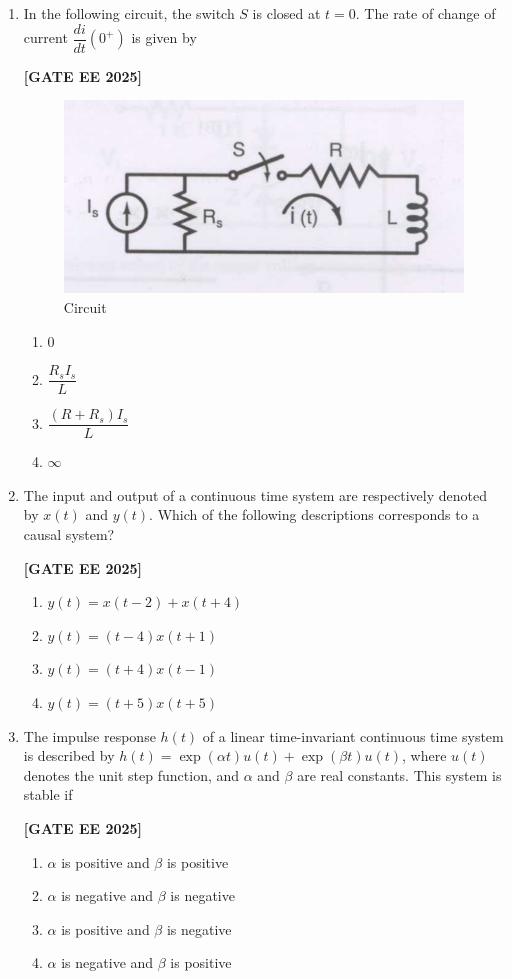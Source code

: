 \documentclass[12pt]{article}
\begin{document}
\begin{enumerate}[leftmargin=2.5em, label=\textbf{Q.\arabic*}., itemsep=2em]
\item In the following circuit, the switch $S$ is closed at $t = 0$. The rate of change of current $\dfrac{di}{dt}(0^+)$ is given by
 
\noindent \textbf{[GATE EE 2025]}
\begin{figure}[H]\centering
\includegraphics[width=0.5\columnwidth]{figs/q8.png}
\caption{Circuit}
\label{fig:q8}
\end{figure}
\begin{enumerate}
    \item 0
    \item $\dfrac{R_s I_s}{L}$
    \item $\dfrac{(R+R_s) I_s}{L}$
    \item $\infty$
\end{enumerate}

\item The input and output of a continuous time system are respectively denoted by $x(t)$ and $y(t)$. Which of the following descriptions corresponds to a causal system?
 
\noindent \textbf{[GATE EE 2025]}
\begin{enumerate}
    \item $y(t) = x(t-2) + x(t+4)$
    \item $y(t) = (t-4) x(t+1)$
    \item $y(t) = (t+4) x(t-1)$
    \item $y(t) = (t+5) x(t+5)$
\end{enumerate}

\item The impulse response $h(t)$ of a linear time-invariant continuous time system is described by $h(t) = \exp(\alpha t) u(t) + \exp(\beta t) u(t)$, where $u(t)$ denotes the unit step function, and $\alpha$ and $\beta$ are real constants. This system is stable if
 
\noindent \textbf{[GATE EE 2025]}
\begin{enumerate}
    \item $\alpha$ is positive and $\beta$ is positive
    \item $\alpha$ is negative and $\beta$ is negative
    \item $\alpha$ is positive and $\beta$ is negative
    \item $\alpha$ is negative and $\beta$ is positive
\end{enumerate}


\end{enumerate}
\end{document}
